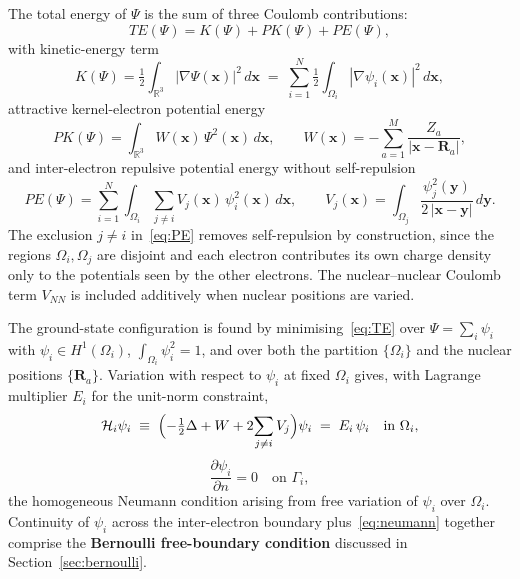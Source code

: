 \documentclass[11pt]{article}
\begin{document}
The total energy of $\Psi$ is the sum of three Coulomb contributions:
\begin{equation}\label{eq:TE}
TE(\Psi) = K(\Psi) + PK(\Psi) + PE(\Psi),
\end{equation}
with kinetic-energy term
\begin{equation}\label{eq:K}
K(\Psi) = \tfrac{1}{2} \int_{\mathbb{R}^3} |\nabla \Psi(\mathbf{x})|^2\, d\mathbf{x}
\;=\; \sum_{i=1}^{N} \tfrac{1}{2} \int_{\Omega_i} |\nabla \psi_i(\mathbf{x})|^2\, d\mathbf{x},
\end{equation}
attractive kernel-electron potential energy
\begin{equation}\label{eq:PK}
PK(\Psi) = \int_{\mathbb{R}^3} W(\mathbf{x})\, \Psi^2(\mathbf{x})\, d\mathbf{x},
\qquad
W(\mathbf{x}) = -\sum_{a=1}^{M} \frac{Z_a}{|\mathbf{x} - \mathbf{R}_a|},
\end{equation}
and inter-electron repulsive potential energy without self-repulsion
\begin{equation}\label{eq:PE}
PE(\Psi) = \sum_{i=1}^{N} \int_{\Omega_i} \sum_{j \ne i} V_j(\mathbf{x})\, \psi_i^2(\mathbf{x})\, d\mathbf{x},
\qquad
V_j(\mathbf{x}) = \int_{\Omega_j} \frac{\psi_j^2(\mathbf{y})}{2\,|\mathbf{x} - \mathbf{y}|}\, d\mathbf{y}.
\end{equation}
The exclusion $j \ne i$ in~\eqref{eq:PE} removes self-repulsion by construction, since the regions $\Omega_i, \Omega_j$ are disjoint and each electron contributes its own charge density only to the potentials seen by the other electrons. The nuclear--nuclear Coulomb term $V_{NN}$ is included additively when nuclear positions are varied.

The ground-state configuration is found by minimising~\eqref{eq:TE} over $\Psi = \sum_i \psi_i$ with $\psi_i \in H^1(\Omega_i)$, $\int_{\Omega_i} \psi_i^2 = 1$, and over both the partition $\{\Omega_i\}$ and the nuclear positions $\{\mathbf{R}_a\}$. Variation with respect to $\psi_i$ at fixed $\Omega_i$ gives, with Lagrange multiplier $E_i$ for the unit-norm constraint,
\begin{equation}\label{eq:Hi}
\mathcal{H}_i \psi_i \;\equiv\; \Bigl(-\tfrac{1}{2}\Delta + W + 2\!\sum_{j \ne i} V_j\Bigr)\psi_i \;=\; E_i\, \psi_i \quad \text{in } \Omega_i,
\end{equation}
\begin{equation}\label{eq:neumann}
\frac{\partial \psi_i}{\partial n} = 0 \quad \text{on } \Gamma_i,
\end{equation}
the homogeneous Neumann condition arising from free variation of $\psi_i$ over $\Omega_i$. Continuity of $\psi_i$ across the inter-electron boundary plus~\eqref{eq:neumann} together comprise the \textbf{Bernoulli free-boundary condition} discussed in Section~\ref{sec:bernoulli}.
\end{document}
